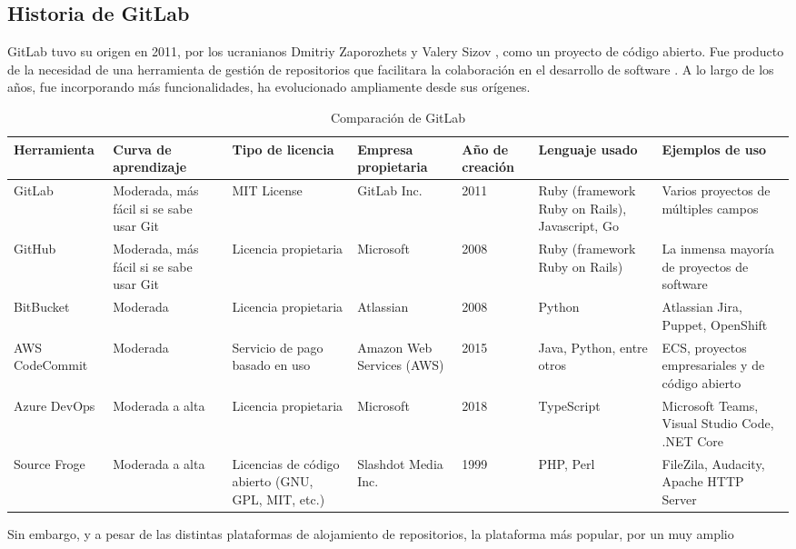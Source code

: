 \documentclass[runningheads]{llncs}
\begin{document}
\subsection{Historia de GitLab}
GitLab tuvo su origen en 2011, por los ucranianos Dmitriy Zaporozhets y Valery Sizov \cite{gitlab2022gitlab}, como un proyecto de código abierto. Fue
producto de la necesidad de una herramienta de gestión de repositorios que facilitara la colaboración en el desarrollo de software \cite{safari2020analysis}.
A lo largo de los años, fue incorporando más funcionalidades, ha evolucionado ampliamente desde sus orígenes.
\begin{table}
        \centering
        \caption{Comparación de GitLab}
        \begin{tabularx}{1.1\textwidth}{X || X | X | X | X | X | X}
            Herramienta & Curva de aprendizaje & Tipo de licencia & Empresa propietaria & Año de creación & Lenguaje usado & Ejemplos de uso \\
            \hline
            \hline
            GitLab & Moderada, más fácil si se sabe usar Git & MIT License & GitLab Inc. & 2011 & Ruby (framework Ruby on Rails), Javascript, Go & Varios proyectos de múltiples campos\\
            GitHub & Moderada, más fácil si se sabe usar Git & Licencia propietaria & Microsoft & 2008 & Ruby (framework Ruby on Rails) & La inmensa mayoría de proyectos de software\\
            BitBucket & Moderada & Licencia propietaria & Atlassian & 2008 & Python & Atlassian Jira, Puppet, OpenShift\\
            AWS CodeCommit & Moderada & Servicio de pago basado en uso & Amazon Web Services (AWS) & 2015 & Java, Python, entre otros & ECS, proyectos empresariales y de código abierto\\
            Azure DevOps & Moderada a alta & Licencia propietaria & Microsoft & 2018 & TypeScript & Microsoft Teams, Visual Studio Code, .NET Core\\
            Source Froge & Moderada a alta & Licencias de código abierto (GNU, GPL, MIT, etc.) & Slashdot Media Inc. & 1999 & PHP, Perl & FileZila, Audacity, Apache HTTP Server\\
            \hline
        \end{tabularx}
        \label{table:3}
\end{table}
Sin embargo, y a pesar de las distintas plataformas de alojamiento de repositorios, la plataforma más popular, por un muy amplio
\end{document}
